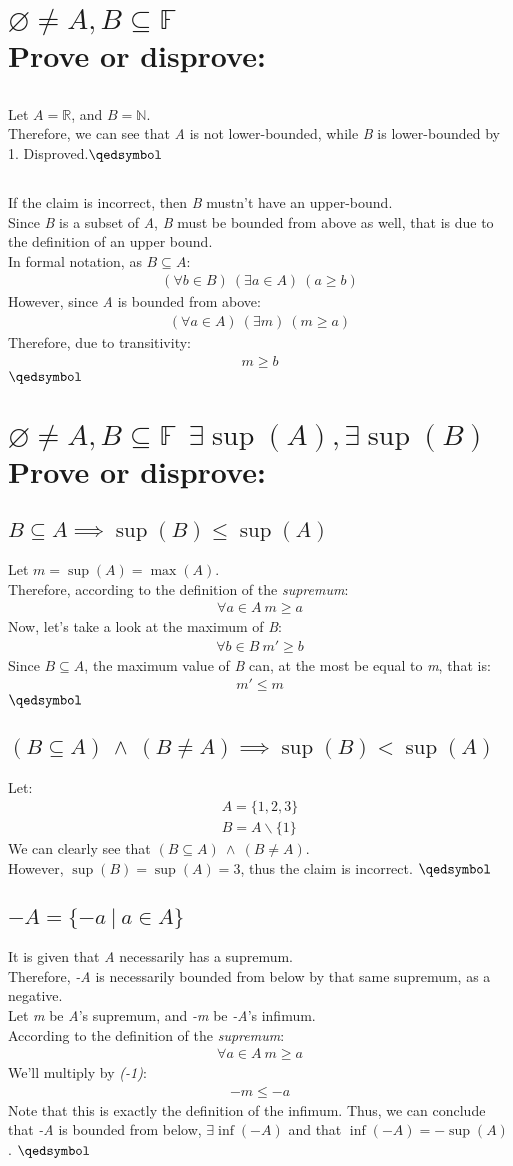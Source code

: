 \documentclass[a4paper, 12pt]{article}
\newcommand{\sub}[1]{\subsection{\underline{#1}}}
\newcommand{\R}{\ensuremath{\mathbb{R}}}
\newcommand{\F}{\ensuremath{\mathbb{F}}}
\newcommand{\N}{\ensuremath{\mathbb{N}}}
\newcommand{\eq}[1]{\begin{align*}#1\end{align*}}
\renewcommand{\qed}{\hfill\(\qedsymbol\)}
\begin{document}
\section{$\varnothing\neq A,B\subseteq\F$\\Prove or disprove:}
\sub{}
Let $A=\R$, and $B=\N$.\\
Therefore, we can see that \textit{A} is not lower-bounded, while \textit{B} is lower-bounded by 1.
Disproved.\qed
\sub{}
If the claim is incorrect, then \textit{B} mustn't have an upper-bound.\\
Since \textit{B} is a subset of \textit{A}, \textit{B} must be bounded from above as well, that is due to the definition of an upper bound.\\
In formal notation, as $B\subseteq{A}$:
\eq{(\forall{b}\in{B})~(\exists{a}\in{A})~(a\geq{b})}
However, since \textit{A} is bounded from above: \eq{(\forall{a}\in{A})~(\exists{m})~(m\geq{a})}
Therefore, due to transitivity: \eq{m\geq{b}}
\qed\pagebreak

\section{$\varnothing\neq A,B\subseteq\F~~\exists\sup(A),\exists\sup(B)$\\Prove or disprove:}
\sub{$B\subseteq{A} \implies \sup(B)\leq\sup(A)$}
Let $m=\sup(A)=\max(A)$.\\
Therefore, according to the definition of the \textit{supremum}:
\eq{\forall{a}\in{A}~m\geq{a}}
Now, let's take a look at the maximum of \textit{B}:
\eq{\forall{b}\in{B}~m'\geq{b}}
Since $B\subseteq{A}$, the maximum value of \textit{B} can, at the most be equal to \textit{m}, that is: \eq{m'\leq{m}}
\qed
\sub{$(B\subseteq{A})~\land~(B\neq{A})\implies \sup(B)<\sup(A)$}
Let: \eq{A=\{1,2,3\}\\B=A\backslash\{1\}}
We can clearly see that $(B\subseteq{A})~\land~(B\neq{A})$.\\
However, $\sup(B)=\sup(A)=3$, thus the claim is incorrect.
\qed
\sub{$-A=\{-a~|~a\in{A}\}$}
It is given that \textit{A} necessarily has a supremum.\\
Therefore, \textit{-A} is necessarily bounded from below by that same supremum, as a negative.\\
Let \textit{m} be \textit{A}'s supremum, and \textit{-m} be \textit{-A}'s infimum.\\
According to the definition of the \textit{supremum}:
\eq{\forall{a}\in{A}~m\geq{a}}
We'll multiply by \textit{(-1)}:
\eq{
    -m\leq{-a}
}
Note that this is exactly the definition of the infimum.
Thus, we can conclude that \textit{-A} is bounded from below, $\exists\inf(-A)$ and that $\inf(-A)=-\sup(A)$.
\qed

\section{}



\end{document}
